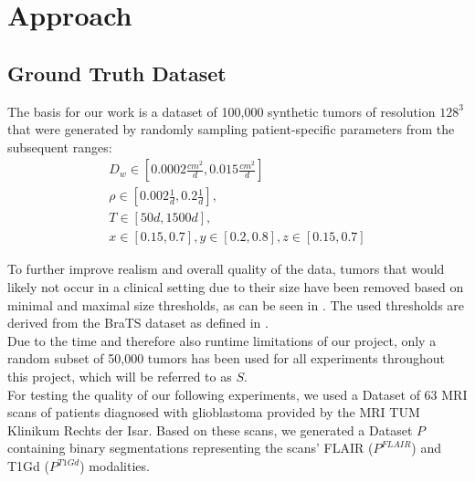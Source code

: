 

\chapter{Approach}\label{chapter:approach}

\section{Ground Truth Dataset}\label{dataset}
The basis for our work is a dataset of 100,000 synthetic tumors of resolution $128^3$ that were generated by
randomly sampling patient-specific parameters from the subsequent ranges:
\begin{gather*}
    D_w \in [0.0002 \frac{cm^2}{d}, 0.015 \frac{cm^2}{d}] \\%
    \rho \in [0.002 \frac{1}{d} , 0.2 \frac{1}{d}], \\ %
    T \in [50d, 1500d], \\
    x \in [0.15,0.7], y \in [0.2, 0.8], z \in [0.15, 0.7]
\end{gather*}

To further improve realism and overall quality of the data, tumors that would likely not occur in a clinical setting due to their size have been removed based on minimal and maximal size thresholds, as can be seen in \parencite{Steinbauer2020}. The used thresholds are derived from the BraTS dataset as defined in \parencite{MenzeMultiModalApproach}.\\
Due to the time and therefore also runtime limitations of our project, only a random subset of 50,000 tumors has been used for all experiments throughout this project, which will be referred to as $S$.\\
For testing the quality of our following experiments, we used a Dataset of 63 MRI scans of patients diagnosed with glioblastoma provided by the MRI TUM Klinikum Rechts der Isar. Based on these scans, we generated a Dataset $P$ containing binary segmentations representing the scans' FLAIR ($P^{FLAIR}$) and T1Gd ($P^{T1Gd}$) modalities.



